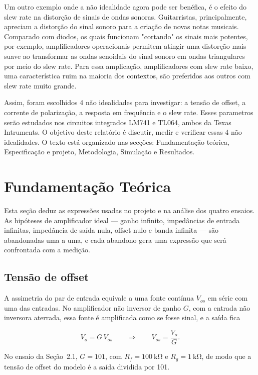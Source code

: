 \documentclass[11pt,a4paper]{article}
\begin{document}
Um outro exemplo onde a não idealidade agora pode ser benéfica, é o efeito do slew rate na distorção de sinais de ondas sonoras.
Guitarristas, principalmente, apreciam a distorção do sinal sonoro para a criação de novas notas musicais. 
Comparado com diodos, os quais funcionam "cortando" os sinais mais potentes, por exemplo, amplificadores operacionais permitem atingir uma distorção mais suave ao transformar as ondas senoidais do sinal sonoro em ondas triangulares por meio do slew rate. Para essa amplicação, amplificadores com slew rate baixo, uma característica ruim na maioria dos contextos, são preferidos aos outros com slew rate muito grande.

Assim, foram escolhidos 4 não idealidades para investigar: a tensão de offset, a corrente de polarização, a resposta em frequência e o slew rate. Esses parametros serão estudados nos circuitos integrados LM741 e TL064, ambos da Texas Intruments.
O objetivo deste relatório é discutir, medir e verificar essas 4 não idealidades. 
O texto está organizado nas secções: Fundamentação teórica, Especificação e projeto, Metodologia, Simulação e Resultados.

\section{Fundamentação Teórica}

Esta seção deduz as expressões usadas no projeto e na análise dos quatro ensaios. As hipóteses de amplificador ideal — ganho infinito, impedâncias de entrada infinitas, impedância de saída nula, offset nulo e banda infinita — são abandonadas uma a uma, e cada abandono gera uma expressão que será confrontada com a medição.

\subsection{Tensão de offset}

A assimetria do par de entrada equivale a uma fonte contínua $V_{os}$ em série com uma das entradas. No amplificador não inversor de ganho $G$, com a entrada não inversora aterrada, essa fonte é amplificada como se fosse sinal, e a saída fica

\begin{equation}
V_o = G \, V_{os} \qquad \Rightarrow \qquad V_{os} = \frac{V_o}{G} .
\label{eq:offset}
\end{equation}

No ensaio da Seção~2.1, $G = 101$, com $R_f = \SI{100}{\kilo\ohm}$ e $R_g = \SI{1}{\kilo\ohm}$, de modo que a tensão de offset do modelo é a saída dividida por 101.
\end{document}
